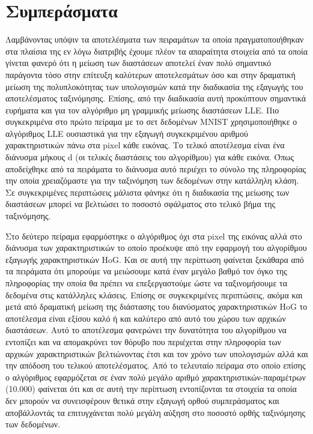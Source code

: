 \chapter{Συμπεράσματα}
\par
Λαμβάνοντας υπόψιν τα αποτελέσματα των πειραμάτων τα οποία πραγματοποιήθηκαν στα πλαίσια της εν λόγω διατριβής έχουμε πλέον τα απαραίτητα στοιχεία από τα οποία γίνεται φανερό ότι η μείωση των διαστάσεων αποτελεί έναν πολύ σημαντικό παράγοντα τόσο στην επίτευξη καλύτερων αποτελεσμάτων όσο και στην δραματική μείωση της πολυπλοκότητας των υπολογισμών κατά την διαδικασία της εξαγωγής του αποτελέσματος ταξινόμησης. Επίσης, από την διαδικασία αυτή προκύπτουν σημαντικά ευρήματα και για τον αλγόριθμο μη γραμμικής μείωσης διαστάσεων \textlatin{LLE}. Πιο συγκεκριμένα στο πρώτο πείραμα με το σετ δεδομένων \textlatin{MNIST} χρησιμοποιήθηκε ο αλγόριθμος \textlatin{LLE} ουσιαστικά για την εξαγωγή συγκεκριμένου αριθμού χαρακτηριστικών πάνω στα \textlatin{pixel} κάθε εικόνας. Το τελικό αποτέλεσμα είναι ένα διάνυσμα μήκους \textlatin{d} (οι τελικές διαστάσεις του αλγορίθμου) για κάθε εικόνα. Όπως αποδείχθηκε από τα πειράματα το διάνυσμα αυτό περιέχει το σύνολο της πληροφορίας την οποία χρειαζόμαστε για την ταξινόμηση των δεδομένων στην κατάλληλη κλάση. Σε συγκεκριμένες περιπτώσεις μάλιστα φάνηκε ότι η διαδικασία της μείωσης των διαστάσεων μπορεί να βελτιώσει το ποσοστό σφάλματος στο τελικό βήμα της ταξινόμησης. 
\par
Στο δεύτερο πείραμα εφαρμόστηκε ο αλγόριθμος όχι στα \textlatin{pixel} της εικόνας αλλά στο διάνυσμα των χαρακτηριστικών το οποίο προέκυψε από την εφαρμογή του αλγορίθμου εξαγωγής χαρακτηριστικών \textlatin{HoG}. Και σε αυτή την περίπτωση φαίνεται ξεκάθαρα από τα πειράματα ότι μπορούμε να μειώσουμε κατά έναν μεγάλο βαθμό τον όγκο της πληροφορίας την οποία θα πρέπει να επεξεργαστούμε ώστε να ταξινομήσουμε τα δεδομένα στις κατάλληλες κλάσεις. Επίσης σε συγκεκριμένες περιπτώσεις, ακόμα και μετά από δραματική μείωση της διάστασης του διανύσματος χαρακτηριστικών \textlatin{HoG} το αποτέλεσμα είναι εξίσου καλό ή και καλύτερο από αυτό του χώρου των αρχικών διαστάσεων. Αυτό το αποτέλεσμα φανερώνει την δυνατότητα του αλγορίθμου να εντοπίζει και να απομακρύνει τον θόρυβο που περιέχεται στην πληροφορία των αρχικών χαρακτηριστικών βελτιώνοντας έτσι και τον χρόνο των υπολογισμών αλλά και την απόδοση του τελικού αποτελέσματος. Από το τελευταίο πείραμα στο οποίο επίσης ο αλγόριθμος εφαρμόζεται σε έναν πολύ μεγάλο αριθμό χαρακτηριστικών-παραμέτρων (10.000) φαίνεται ότι και σε αυτή την περίπτωση εντοπίζονται τα στοιχεία τα οποία δεν μπορούν να συνεισφέρουν θετικά στην εξαγωγή ορθού συμπεράσματος και αποβάλλοντάς τα επιτυγχάνεται πολύ μεγάλη αύξηση στο ποσοστό ορθής ταξινόμησης των δεδομένων.
